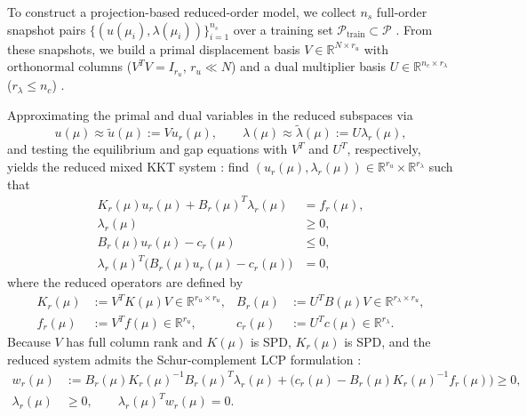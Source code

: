 \documentclass[11pt,a4paper]{article}
\begin{document}
To construct a projection-based reduced-order model, we collect \(n_s\) full-order snapshot pairs \(\{(u(\mu_i), \lambda(\mu_i))\}_{i=1}^{n_s}\) over a training set \(\mathcal{P}_{\text{train}} \subset \mathcal{P}\) \cite{balajewicz2016projection, benaceur2020reduced}. From these snapshots, we build a primal displacement basis \(V \in \mathbb{R}^{N \times r_u}\) with orthonormal columns (\(V^T V = I_{r_u}\), \(r_u \ll N\)) and a dual multiplier basis \(U \in \mathbb{R}^{n_c \times r_\lambda}\) (\(r_\lambda \le n_c\)) \cite{balajewicz2016projection, benaceur2020reduced, fauque2018hybrid, sambataro2026model}.

Approximating the primal and dual variables in the reduced subspaces via
\begin{equation}\label{eq:lift}u(\mu) \approx \tilde{u}(\mu) := V u_r(\mu), \qquad \lambda(\mu) \approx \tilde{\lambda}(\mu) := U \lambda_r(\mu),\end{equation}
and testing the equilibrium and gap equations with \(V^T\) and \(U^T\), respectively, yields the reduced mixed KKT system \cite{balajewicz2016projection, leberre2022condition}: find \((u_r(\mu), \lambda_r(\mu)) \in \mathbb{R}^{r_u} \times \mathbb{R}^{r_\lambda}\) such that
\begin{equation}\label{eq:red-kkt}\begin{aligned}
K_r(\mu) u_r(\mu) + B_r(\mu)^T \lambda_r(\mu) &= f_r(\mu), \\
\lambda_r(\mu) &\ge 0, \\
B_r(\mu) u_r(\mu) - c_r(\mu) &\le 0, \\
\lambda_r(\mu)^T \bigl(B_r(\mu) u_r(\mu) - c_r(\mu)\bigr) &= 0,
\end{aligned}\end{equation}
where the reduced operators are defined by
\begin{equation}\label{eq:red-ops}\begin{aligned}
K_r(\mu) &:= V^T K(\mu) V \in \mathbb{R}^{r_u \times r_u}, & B_r(\mu) &:= U^T B(\mu) V \in \mathbb{R}^{r_\lambda \times r_u}, \\
f_r(\mu) &:= V^T f(\mu) \in \mathbb{R}^{r_u}, & c_r(\mu) &:= U^T c(\mu) \in \mathbb{R}^{r_\lambda}.
\end{aligned}\end{equation}
Because \(V\) has full column rank and \(K(\mu)\) is SPD, \(K_r(\mu)\) is SPD, and the reduced system admits the Schur-complement LCP formulation \cite{balajewicz2016projection, leberre2022condition}:
\begin{equation}\label{eq:red-lcp}\begin{aligned}
w_r(\mu) &:= B_r(\mu) K_r(\mu)^{-1} B_r(\mu)^T \lambda_r(\mu) + \bigl(c_r(\mu) - B_r(\mu) K_r(\mu)^{-1} f_r(\mu)\bigr) \ge 0, \\
\lambda_r(\mu) &\ge 0, \qquad \lambda_r(\mu)^T w_r(\mu) = 0.
\end{aligned}\end{equation}
\end{document}

